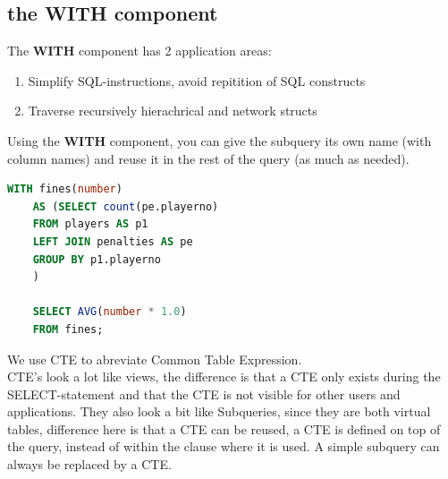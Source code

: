 \documentclass{report}
\begin{document}
	\subsection{the WITH component}
	The \textbf{WITH} component has 2 application areas: 
	\begin{enumerate}
		\item Simplify SQL-instructions, avoid repitition of SQL constructs
		\item Traverse recursively hierachrical and network structs
	\end{enumerate}
	Using the \textbf{WITH} component, you can give the subquery its own name (with column names) and reuse it in the rest of the query (as much as needed).
	\begin{lstlisting}[language=sql]
	WITH fines(number)
	AS (SELECT count(pe.playerno)
	FROM players AS p1
	LEFT JOIN penalties AS pe
	GROUP BY p1.playerno
	)
	
	SELECT AVG(number * 1.0)
	FROM fines;	\end{lstlisting}
	We use CTE to abreviate Common Table Expression.
	\\
	CTE's look a lot like views, the difference is that a CTE only exists during the SELECT-statement and that the CTE is not visible for other users and applications. They also look a bit like Subqueries, since they are both virtual tables, difference here is that a CTE can be reused, a CTE is defined on top of the query, instead of within the clause where it is used. A simple subquery can always be replaced by a CTE.
	
\end{document}
